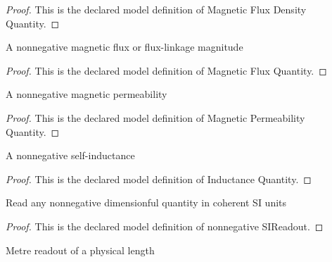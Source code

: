 \begin{proof}
  This is the declared model definition of Magnetic Flux Density Quantity.
\end{proof}
\begin{definition}
  \label{def:physics:phyx-mini-0922:phyxminiproblems-problemphyxmini0922-magneticfluxquantity}
  A nonnegative magnetic flux or flux-linkage magnitude
\end{definition}
\begin{proof}
  This is the declared model definition of Magnetic Flux Quantity.
\end{proof}
\begin{definition}
  \label{def:physics:phyx-mini-0922:phyxminiproblems-problemphyxmini0922-magneticpermeabilityquantity}
  A nonnegative magnetic permeability
\end{definition}
\begin{proof}
  This is the declared model definition of Magnetic Permeability Quantity.
\end{proof}
\begin{definition}
  \label{def:physics:phyx-mini-0922:phyxminiproblems-problemphyxmini0922-inductancequantity}
  A nonnegative self-inductance
\end{definition}
\begin{proof}
  This is the declared model definition of Inductance Quantity.
\end{proof}
\begin{definition}
  \label{def:physics:phyx-mini-0922:phyxminiproblems-problemphyxmini0922-nonnegativesireadout}
  Read any nonnegative dimensionful quantity in coherent SI units
\end{definition}
\begin{proof}
  This is the declared model definition of nonnegative SIReadout.
\end{proof}
\begin{definition}
  \label{def:physics:phyx-mini-0922:phyxminiproblems-problemphyxmini0922-lengthinmeters}
  Metre readout of a physical length
\end{definition}
